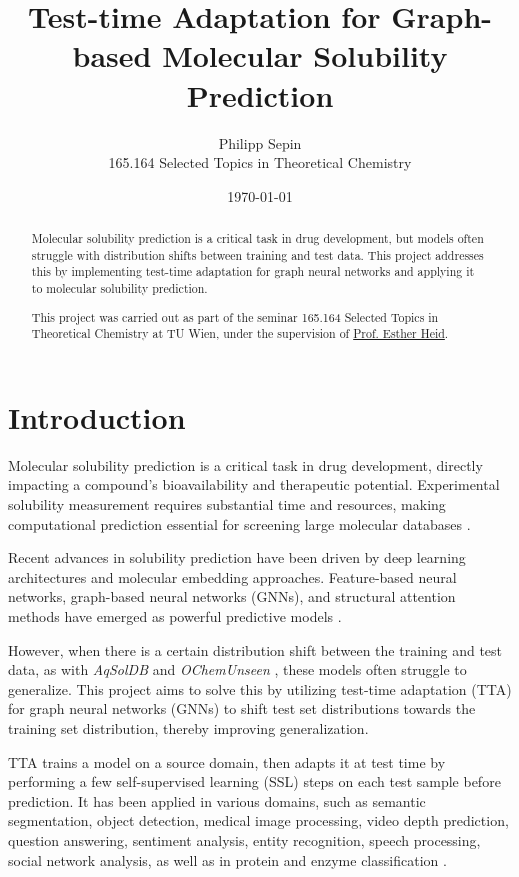 \documentclass[11pt,a4paper]{article}
\title{Test-time Adaptation for Graph-based Molecular Solubility Prediction}
\author{Philipp Sepin\\
        165.164 Selected Topics in Theoretical Chemistry}
\date{\today}
\begin{document}
\maketitle

\begin{abstract}
        Molecular solubility prediction is a critical task in drug development, but models often struggle with distribution shifts between training and test data. This project addresses this by implementing test-time adaptation for graph neural networks and applying it to molecular solubility prediction.

        This project was carried out as part of the seminar 165.164 Selected Topics in Theoretical Chemistry at TU Wien, under the supervision of \href{https://hesther.github.io/}{Prof. Esther Heid}.
\end{abstract}

\section{Introduction}
Molecular solubility prediction is a critical task in drug development, directly impacting a compound's bioavailability and therapeutic potential. Experimental solubility measurement requires substantial time and resources, making computational prediction essential for screening large molecular databases \cite{llompart2024will}.

Recent advances in solubility prediction have been driven by deep learning architectures and molecular embedding approaches. Feature-based neural networks, graph-based neural networks (GNNs), and structural attention methods have emerged as powerful predictive models \cite{llompart2024will}.

However, when there is a certain distribution shift between the training and test data, as with \textit{AqSolDB} \cite{sorkun2019aqsoldb} and \textit{OChemUnseen} \cite{llompart2024will}, these models often struggle to generalize. This project aims to solve this by utilizing test-time adaptation (TTA) for graph neural networks (GNNs) to shift test set distributions towards the training set distribution, thereby improving generalization.

TTA trains a model on a source domain, then adapts it at test time by performing a few self-supervised learning (SSL) steps on each test sample before prediction. It has been applied in various domains, such as semantic segmentation, object detection, medical image processing, video depth prediction, question answering, sentiment analysis, entity recognition, speech processing, social network analysis, as well as in protein and enzyme classification \cite{liang2025comprehensive, cui2025online}.
\end{document}
